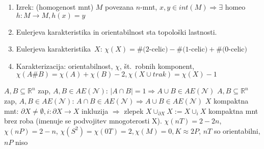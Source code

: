 \documentclass[10pt,a4paper]{article}
\begin{document}
\begin{enumerate}
\item Izrek: (homogenost mnt) $M$ povezana $n$-mnt, $x, y \in int(M) \Rightarrow \exists$ homeo $h: M \rightarrow M, h(x)=y$
    
\item Eulerjeva karakteristika in orientabilnost sta topološki lastnosti.
    
\item Eulerjeva karakteristika~$X$: $\chi(X) = \text{\#($2$-celic)} - \text{\#($1$-celic)} + \text{\#($0$-celic)}$
    
\item Karakterizacija: orientabilnost, $\chi$, št.~robnih komponent, $\chi(A \# B) = \chi(A) + \chi(B) - 2, \chi(X \cup trak) = \chi(X) - 1$
\end{enumerate}
$A, B \subseteq\mathbb{R}^n$
zap, $A, B \in AE(\mathcal{N})$:
$|A \cap B| = 1 \Rightarrow A \cup B \in AE(\mathcal{N})$ \newline
$A, B \subseteq\mathbb{R}^n$
zap, $A, B \in AE(\mathcal{N})$:
$A \cap B \in AE(\mathcal{N})\Rightarrow A \cup B \in AE(\mathcal{N})$ \newline
$X$ kompaktna mnt: $\partial X \neq \emptyset, i: \partial X \rightarrow X$ inkluzija $\Rightarrow$ zlepek $X \cup_{\partial X} X := X \cup _i X$ kompaktna mnt brez roba (imenuje se podvojitev mnogoterosti X). \quad
$\chi(nT) = 2 - 2n$, $\chi(nP) = 2 - n$, $\chi(S^2) = \chi(0T) = 2, \chi(M) = 0, K \approx 2P$, $nT$ so orientabilni, $nP$ niso
\end{document}
